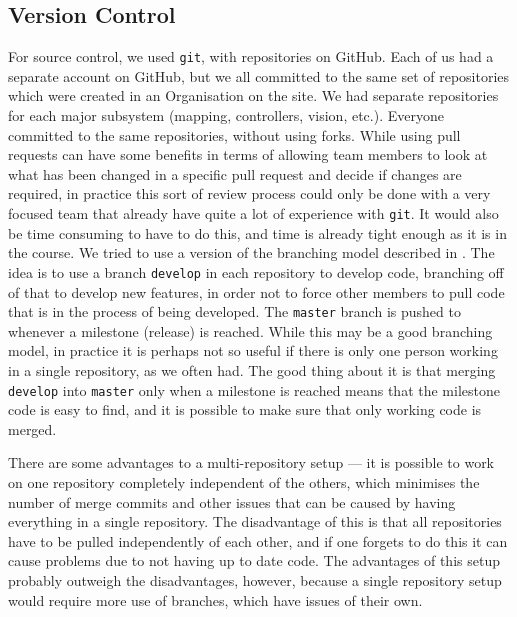\documentclass[10pt,a4paper,twocolumn]{article}
\begin{document}
\subsection{Version Control}
For source control, we used \texttt{git}, with repositories on GitHub. Each of
us had a separate account on GitHub, but we all committed to the same set of
repositories which were created in an Organisation on the site. We had separate
repositories for each major subsystem (mapping, controllers, vision, etc.).
Everyone committed to the same repositories, without using forks. While using
pull requests can have some benefits in terms of allowing team members to look
at what has been changed in a specific pull request and decide if changes are
required, in practice this sort of review process could only be done with a very
focused team that already have quite a lot of experience with \texttt{git}. It
would also be time consuming to have to do this, and time is already tight
enough as it is in the course. We tried to use a version of the branching model
described in \cite{nviebranch}. The idea is to use a branch \texttt{develop} in
each repository to develop code, branching off of that to develop new features,
in order not to force other members to pull code that is in the process of being
developed. The \texttt{master} branch is pushed to whenever a milestone
(release) is reached. While this may be a good branching model, in practice it
is perhaps not so useful if there is only one person working in a single
repository, as we often had. The good thing about it is that merging
\texttt{develop} into \texttt{master} only when a milestone is reached means
that the milestone code is easy to find, and it is possible to make sure that
only working code is merged.

There are some advantages to a multi-repository setup --- it is possible to work
on one repository completely independent of the others, which minimises the
number of merge commits and other issues that can be caused by having everything
in a single repository. The disadvantage of this is that all repositories have
to be pulled independently of each other, and if one forgets to do this it can
cause problems due to not having up to date code. The advantages of this setup
probably outweigh the disadvantages, however, because a single repository setup
would require more use of branches, which have issues of their own.
\end{document}
